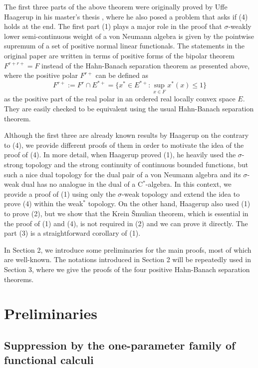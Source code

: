 \documentclass[11pt]{amsart}
\theoremstyle{plain}
\theoremstyle{definition}
\begin{document}
The first three parts of the above theorem were originally proved by Uffe Haagerup in his master's thesis \cite{MR380438}, where he also posed a problem that asks if (4) holds at the end.
The first part (1) plays a major role in the proof that $\sigma$-weakly lower semi-continuous weight of a von Neumann algebra is given by the pointwise supremum of a set of positive normal linear functionals.
The statements in the original paper are written in terms of positive forms of the bipolar theorem $F^{r+r+}=F$ instead of the Hahn-Banach separation theorem as presented above, where the positive polar $F^{r+}$ can be defined as
\[F^{r+}:=F^r\cap E^{*+}=\{x^*\in E^{*+}:\sup_{x\in F}x^*(x)\le1\}\]
as the positive part of the real polar in an ordered real locally convex space $E$.
They are easily checked to be equivalent using the usual Hahn-Banach separation theorem.

Although the first three are already known results by Haagerup on the contrary to (4), we provide different proofs of them in order to motivate the idea of the proof of (4).
In more detail, when Haagerup proved (1), he heavily used the $\sigma$-strong topology and the strong continuity of continuous bounded functions, but such a nice dual topology for the dual pair of a von Neumann algebra and its $\sigma$-weak dual has no analogue in the dual of a C$^*$-algebra.
In this context, we provide a proof of (1) using only the $\sigma$-weak topology and extend the idea to prove (4) within the weak$^*$ topology.
On the other hand, Haagerup also used (1) to prove (2), but we show that the Krein \v Smulian theorem, which is essential in the proof of (1) and (4), is not required in (2) and we can prove it directly.
The part (3) is a straightforward corollary of (1).

In Section 2, we introduce some preliminaries for the main proofs, most of which are well-known.
The notations introduced in Section 2 will be repeatedly used in Section 3, where we give the proofs of the four positive Hahn-Banach separation theorems.


\section{Preliminaries}


\subsection{Suppression by the one-parameter family of functional calculi}
\end{document}
